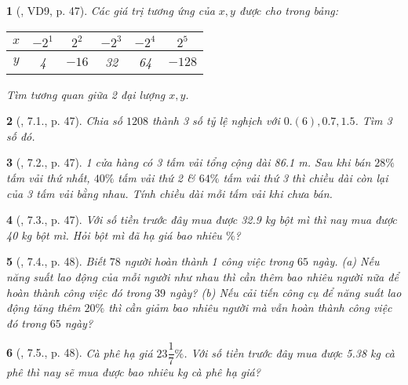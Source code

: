 \documentclass{article}
\newtheorem{baitoan}{}
\begin{document}
\begin{baitoan}[\cite{Binh_boi_duong_Toan_7_tap_1}, VD9, p. 47]
	Các giá trị tương ứng của $x,y$ được cho trong bảng:
	\begin{table}[H]
		\centering
		\begin{tabular}{|c|c|c|c|c|c|}
			\hline
			$x$ & $-2^1$ & $2^2$ & $-2^3$ & $-2^4$ & $2^5$ \\
			\hline
			$y$ & 4 & $-16$ & 32 & 64 & $-128$ \\
			\hline
		\end{tabular}
	\end{table}
	\noindent Tìm tương quan giữa 2 đại lượng $x,y$.
\end{baitoan}

\begin{baitoan}[\cite{Binh_boi_duong_Toan_7_tap_1}, 7.1., p. 47]
	Chia số $1208$ thành 3 số tỷ lệ nghịch với $0.(6),0.7,1.5$. Tìm 3 số đó.
\end{baitoan}

\begin{baitoan}[\cite{Binh_boi_duong_Toan_7_tap_1}, 7.2., p. 47]
	1 cửa hàng có 3 tấm vải tổng cộng dài {\rm86.1 m}. Sau khi bán $28\%$ tấm vải thứ nhất, $40\%$ tấm vải thứ 2 \& $64\%$ tấm vải thứ 3 thì chiều dài còn lại của 3 tấm vải bằng nhau. Tính chiều dài mỗi tấm vải khi chưa bán.
\end{baitoan}

\begin{baitoan}[\cite{Binh_boi_duong_Toan_7_tap_1}, 7.3., p. 47]
	Với số tiền trước đây mua được {\rm32.9 kg} bột mì thì nay mua được {\rm40 kg} bột mì. Hỏi bột mì đã hạ giá bao nhiêu $\%$?
\end{baitoan}

\begin{baitoan}[\cite{Binh_boi_duong_Toan_7_tap_1}, 7.4., p. 48]
	Biết $78$ người hoàn thành 1 công việc trong $65$ ngày. (a) Nếu năng suất lao động của mỗi người như nhau thì cần thêm bao nhiêu người nữa để hoàn thành công việc đó trong $39$ ngày? (b) Nếu cải tiến công cụ để năng suất lao động tăng thêm $20\%$ thì cần giảm bao nhiêu người mà vẫn hoàn thành công việc đó trong $65$ ngày?
\end{baitoan}

\begin{baitoan}[\cite{Binh_boi_duong_Toan_7_tap_1}, 7.5., p. 48]
	Cà phê hạ giá $23\dfrac{1}{7}\%$. Với số tiền trước đây mua được {\rm5.38 kg} cà phê thì nay sẽ mua được bao nhiêu {\rm kg} cà phê hạ giá?
\end{baitoan}
\end{document}
